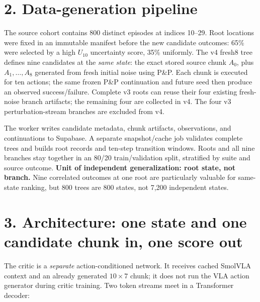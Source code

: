 \documentclass[10pt,letterpaper]{article}
\begin{document}
\section*{2. Data-generation pipeline}
\begin{center}
\end{center}
The source cohort contains 800 distinct episodes at indices 10--29. Root locations were fixed in an immutable manifest before the new candidate outcomes: 65\% were selected by a high $U_{10}$ uncertainty score, 35\% uniformly. The v4 fresh8 tree defines nine candidates at the \emph{same state}: the exact stored source chunk $A_0$, plus $A_1,\dots,A_8$ generated from fresh initial noise using P\&P. Each chunk is executed for ten actions; the same frozen P\&P continuation and future seed then produce an observed success/failure. Complete v3 roots can reuse their four existing fresh-noise branch artifacts; the remaining four are collected in v4. The four v3 perturbation-stream branches are excluded from v4.

The worker writes candidate metadata, chunk artifacts, observations, and continuations to Supabase. A separate snapshot/cache job validates complete trees and builds root records and ten-step transition windows. Roots and all nine branches stay together in an 80/20 train/validation split, stratified by suite and source outcome. \textbf{Unit of independent generalization: root state, not branch.} Nine correlated outcomes at one root are particularly valuable for same-state ranking, but 800 trees are 800 states, not 7,200 independent states.

\newpage
\section*{3. Architecture: one state and one candidate chunk in, one score out}
The critic is a \emph{separate} action-conditioned network. It receives cached SmolVLA context and an already generated $10\times7$ chunk; it does not run the VLA action generator during critic training. Two token streams meet in a Transformer decoder:
\end{document}
